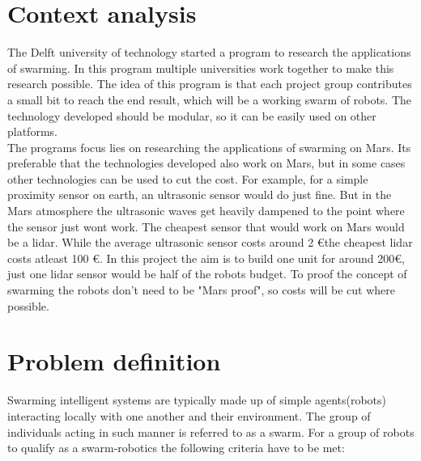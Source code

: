 \documentclass[10pt,a4paper]{article}
\begin{document}
\section{Context analysis} 
The Delft university of technology started a program to research the applications of swarming. In this program multiple universities work together to make this research possible. The idea of this program is that each project group contributes a small bit to reach the end result, which will be a working swarm of robots. The technology developed should be modular, so it can be easily used on other platforms.\\The programs focus lies on researching the applications of swarming on Mars. Its preferable that the technologies developed also work on Mars, but in some cases other technologies can be used to cut the cost. For example, for a simple proximity sensor on earth, an ultrasonic sensor would do just fine. But in the Mars atmosphere the ultrasonic waves get heavily dampened to the point where the sensor just wont work\cite{soundonmars}. The cheapest sensor that would work on Mars would be a lidar\cite{lidarmars}. While the average ultrasonic sensor costs around 2 \euro the cheapest lidar costs atleast 100 \euro. In this project the aim is to build one unit for around 200\euro, just one lidar sensor would be half of the robots budget. To proof the concept of swarming the robots don't need to be "Mars proof", so costs will be cut where possible.\\

\section{Problem definition}
Swarming intelligent systems are typically made up of simple agents(robots) interacting locally with one another and their environment. The group of individuals acting in such manner is referred to as a swarm\cite{swarmintelligence}. For a group of robots to qualify as a swarm-robotics the following criteria have to be met:
\end{document}

